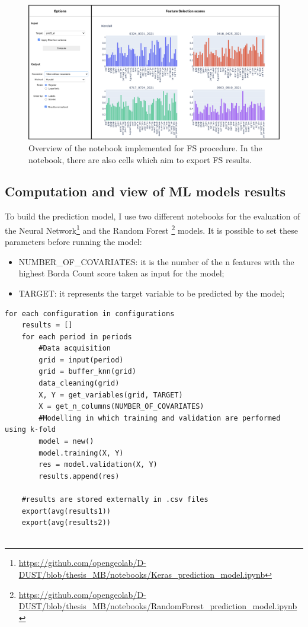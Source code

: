 \begin{figure}[H]
    \centering
    \includegraphics[scale=0.40]{images/notebook.png}
    \caption{Overview of the notebook implemented for FS procedure. In the notebook, there are also cells which aim to export FS results.}
    \label{fig:notebook}
\end{figure}
\pagebreak


\subsection{Computation and view of ML models results}
To build the prediction model, I use two different notebooks for the evaluation of the Neural Network\footnote{\url{https://github.com/opengeolab/D-DUST/blob/thesis_MB/notebooks/Keras_prediction_model.ipynb}} and the Random Forest \footnote{\url{https://github.com/opengeolab/D-DUST/blob/thesis_MB/notebooks/RandomForest_prediction_model.ipynb}} models. 
It is possible to set these parameters before running the model:
\begin{itemize}
    \item NUMBER\_OF\_COVARIATES: it is the number of the n features with the highest Borda Count score taken as input for the model;
    \item TARGET: it represents the target variable to be predicted by the model;
\end{itemize}
\begin{verbatim}
for each configuration in configurations
    results = []
    for each period in periods
        #Data acquisition
        grid = input(period)
        grid = buffer_knn(grid)
        data_cleaning(grid)
        X, Y = get_variables(grid, TARGET)
        X = get_n_columns(NUMBER_OF_COVARIATES)
        #Modelling in which training and validation are performed using k-fold
        model = new()
        model.training(X, Y)
        res = model.validation(X, Y)
        results.append(res)
    
    #results are stored externally in .csv files
    export(avg(results1))
    export(avg(results2))
 
\end{verbatim}

